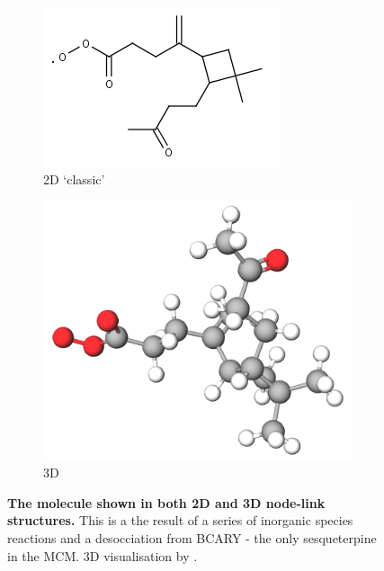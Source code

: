 \begin{figure}[H]
    \centering
    \begin{subfigure}[b]{0.34\textwidth}
        \centering
        \includegraphics[width=\textwidth]{C141CO3.png}
        \caption{2D `classic'}
    \end{subfigure}
    \begin{subfigure}[b]{0.34\textwidth}
        \centering
        \includegraphics[width=\textwidth]{C141CO33d.png}
        \caption{3D}
    \end{subfigure}
       \caption{\textbf{The molecule  shown in both 2D and 3D node-link structures.} This is a the result of a series of inorganic species reactions and a desocciation from BCARY - the only sesqueterpine in the MCM.  3D visualisation by \citep{mol3d}. }
       \label{fig:mol}
\end{figure}

